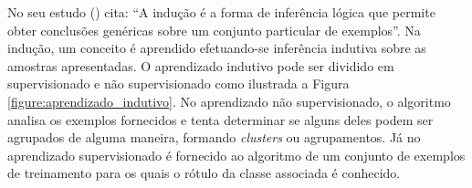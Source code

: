 
No seu estudo  
(\citeyear{monard_baranauskas:2003}) cita: ``A indução é a forma de 
inferência lógica que permite obter conclusões genéricas sobre um conjunto 
particular de exemplos''. Na indução, um conceito é aprendido efetuando-se 
inferência indutiva sobre as amostras apresentadas. O aprendizado indutivo 
pode ser dividido em supervisionado e não supervisionado como ilustrada a 
Figura \ref{figure:aprendizado_indutivo}. No aprendizado não supervisionado, o 
algoritmo analisa os exemplos fornecidos e tenta determinar se alguns deles 
podem ser agrupados de alguma maneira, formando \textit{clusters} ou 
agrupamentos. Já no aprendizado supervisionado é fornecido ao algoritmo de um 
conjunto de exemplos de treinamento para os quais o rótulo da classe associada 
é conhecido.

